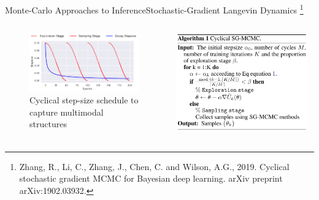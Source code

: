 \documentclass[AERbeamer%
              ,optEnglish%
              ,optBiber%
              ,optBibstyleAlphabetic%
              ,optBeamerClassicFormat%
              ]{AERlatex}%
\begin{document}
\begin{frame}[c]{Monte-Carlo Approaches to Inference}{Stochastic-Gradient Langevin Dynamics \footnote{Zhang, R., Li, C., Zhang, J., Chen, C. and Wilson, A.G., 2019. Cyclical
                                                                                                      stochastic gradient MCMC for Bayesian deep learning. arXiv preprint arXiv:1902.03932.}}
    \centering
    \begin{columns}[T]
        \begin{column}{0.48\textwidth}
            \begin{figure}
                \centering
                \includegraphics[width=\textwidth]{SGMCMCStepSize.png}
                \caption{Cyclical step-size schedule to capture multimodal structures}
            \end{figure}
        \end{column}
        \begin{column}{0.48\textwidth}
            \centering
            \includegraphics[width=0.95\textwidth]{SGMCMCAlgo.png}
        \end{column}
    \end{columns}
\end{frame}
\end{document}

